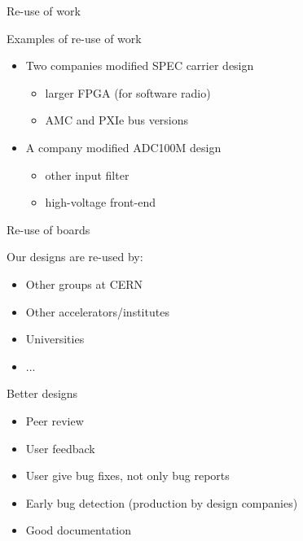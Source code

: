 \documentclass[compress,red]{beamer}
\begin{document}
\begin{frame}{Re-use of work}

  \begin{block}{Examples of re-use of work}
    \begin{itemize}
    \item Two companies modified SPEC carrier design
      \begin{itemize}
      \item larger FPGA (for software radio)
      \item AMC and PXIe bus versions
      \end{itemize}
    \item A company modified ADC100M design
      \begin{itemize}
      \item other input filter
      \item high-voltage front-end
      \end{itemize}
    \end{itemize}
  \end{block}

\end{frame}

\begin{frame}{Re-use of boards}

  \begin{block}{Our designs are re-used by:}
    \begin{itemize}
    \item Other groups at CERN
    \item Other accelerators/institutes
    \item Universities
    \item ...
    \end{itemize}
  \end{block}

\end{frame}

\begin{frame}{Better designs}

  \begin{block}{}
    \begin{itemize}
    \item Peer review
    \item User feedback
    \item User give bug fixes, not only bug reports
    \item Early bug detection (production by design companies)
    \item Good documentation
    \end{itemize}
  \end{block}

\end{frame}
\end{document}
